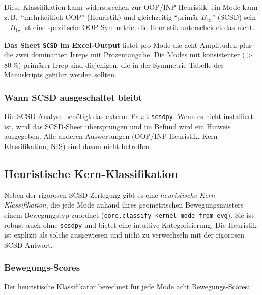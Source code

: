 \documentclass[11pt,a4paper,twoside]{article}
\newcommand{\Bgi}[1]{B_{\mathrm{#1g}}}
\theoremstyle{remark}
\begin{document}
Diese Klassifikation kann widersprechen zur OOP/INP-Heuristik: ein
Mode kann z.\,B.\ "`mehrheitlich OOP"' (Heuristik) und gleichzeitig
"`prim\"ar $\Bgi{1}$"' (SCSD) sein -- $\Bgi{1}$ ist eine spezifische
OOP-Symmetrie, die Heuristik unterscheidet das nicht.

\begin{infobox}
\textbf{Das Sheet \texttt{SCSD} im Excel-Output} listet pro Mode die
acht Amplituden plus die zwei dominanten Irreps mit Prozentangabe. Die
Modes mit konsistenter ($>$80\,\%) prim\"arer Irrep sind diejenigen,
die in der Symmetrie-Tabelle des Manuskripts gef\"uhrt werden sollten.
\end{infobox}

\subsubsection*{Wann SCSD ausgeschaltet bleibt}

Die SCSD-Analyse ben\"otigt das externe Paket \texttt{scsdpy}. Wenn
es nicht installiert ist, wird das SCSD-Sheet \"ubersprungen und im
Befund wird ein Hinweis ausgegeben. Alle anderen Auswertungen
(OOP/INP-Heuristik, Kern-Klassifikation, NIS) sind davon nicht
betroffen.

\subsection{Heuristische Kern-Klassifikation}
\label{sec:kern-klassifikation}

Neben der rigorosen SCSD-Zerlegung gibt es eine \emph{heuristische
Kern-Klassifikation}, die jede Mode anhand ihres geometrischen
Bewegungsmusters einem Bewegungstyp zuordnet
(\texttt{core.classify\_kernel\_mode\_from\_evg}). Sie ist robust auch
ohne \texttt{scsdpy} und bietet eine intuitive Kategorisierung. Die
Heuristik ist explizit als solche ausgewiesen und nicht zu verwechseln
mit der rigorosen SCSD-Antwort.

\subsubsection*{Bewegungs-Scores}

Der heuristische Klassifikator berechnet f\"ur jede Mode acht
Bewegungs-Scores:
\end{document}
